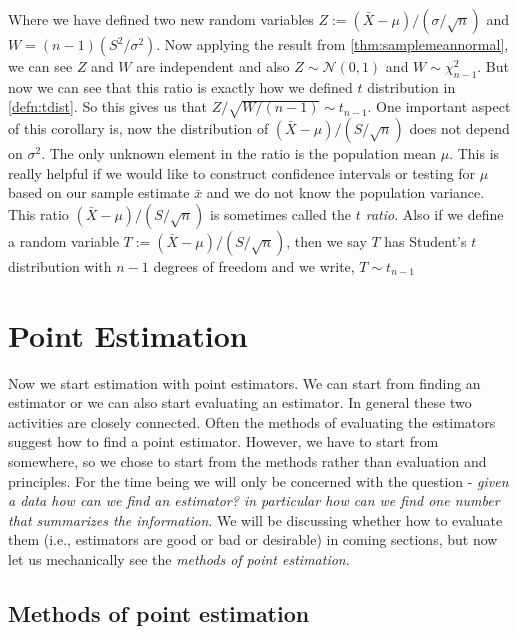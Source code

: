 \documentclass[ 11pt,%
				a4paper,%
				twoside,%
				headinclude,%
				footinclude = true,%
				cleardoublepage = empty,%
				reqno]{scrbook}
\begin{document}
\begin{remarks}
\begin{itemize}
  Where we have defined two new random variables $Z:= (\bar{X}-\mu) /(\sigma / \sqrt{n})$ and $W =(n-1) \left(S^{2} / \sigma^{2}\right)$. Now applying the result from \cref{thm:samplemeannormal}, we can see $Z$ and $W$ are independent and also $Z \sim \mathcal{N}(0, 1)$ and $ W \sim \chi^2_{n-1}$. But now we can see that this ratio is exactly how we defined $t$ distribution in \cref{defn:tdist}. So this gives us that $Z/\sqrt{W/(n-1)} \sim t_{n-1}$. One important aspect of this corollary is, now the distribution of $(\bar{X}-\mu)/ (S / \sqrt{n})$ does not depend on $\sigma^2$. The only unknown element in the ratio is the population mean $\mu$. This is really helpful if we would like to construct confidence intervals or testing for $\mu$ based on our sample estimate $\bar{x}$ and we do not know the population variance. This ratio $(\bar{X}-\mu)/ (S / \sqrt{n})$ is sometimes called the \emph{$t$ ratio}. Also if we define a random variable $T := (\bar{X}-\mu)/ (S / \sqrt{n})$, then we say $T$ has Student's $t$ distribution with $n-1$ degrees of freedom and we write, $T \sim t_{n-1}$



\end{itemize}
   
\end{remarks}



\newpage 

\section{Point Estimation}
Now we start estimation with point estimators. We can start from finding an estimator or we can also start evaluating an estimator. In general these two activities are closely connected. Often the methods of evaluating the estimators suggest how to find a point estimator. However, we have to start from somewhere, so we chose to start from the methods rather than evaluation and principles. For the time being we will only be concerned with the question - \emph{given a data how can we find an estimator? in particular how can we find one number that summarizes the information}. We will be discussing whether how to evaluate them (i.e., estimators are good or bad or desirable) in coming sections, but now let us mechanically see the \emph{methods of point estimation}.



\subsection{Methods of point estimation}
\end{document}
